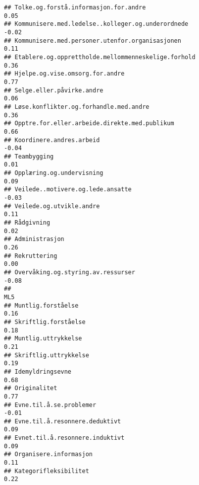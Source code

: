 \documentclass[
]{article}
\begin{document}
\begin{verbatim}
## Tolke.og.forstå.informasjon.for.andre                                             0.05
## Kommunisere.med.ledelse..kolleger.og.underordnede                                -0.02
## Kommunisere.med.personer.utenfor.organisasjonen                                   0.11
## Etablere.og.opprettholde.mellommenneskelige.forhold                               0.36
## Hjelpe.og.vise.omsorg.for.andre                                                   0.77
## Selge.eller.påvirke.andre                                                         0.06
## Løse.konflikter.og.forhandle.med.andre                                            0.36
## Opptre.for.eller.arbeide.direkte.med.publikum                                     0.66
## Koordinere.andres.arbeid                                                         -0.04
## Teambygging                                                                       0.01
## Opplæring.og.undervisning                                                         0.09
## Veilede..motivere.og.lede.ansatte                                                -0.03
## Veilede.og.utvikle.andre                                                          0.11
## Rådgivning                                                                        0.02
## Administrasjon                                                                    0.26
## Rekruttering                                                                      0.00
## Overvåking.og.styring.av.ressurser                                               -0.08
##                                                                                    ML5
## Muntlig.forståelse                                                                0.16
## Skriftlig.forståelse                                                              0.18
## Muntlig.uttrykkelse                                                               0.21
## Skriftlig.uttrykkelse                                                             0.19
## Idemyldringsevne                                                                  0.68
## Originalitet                                                                      0.77
## Evne.til.å.se.problemer                                                          -0.01
## Evne.til.å.resonnere.deduktivt                                                    0.09
## Evnet.til.å.resonnere.induktivt                                                   0.09
## Organisere.informasjon                                                            0.11
## Kategorifleksibilitet                                                             0.22

\end{verbatim}
\end{document}
